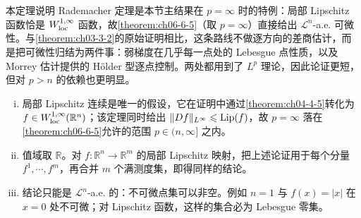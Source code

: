 \documentclass[../../main.tex]{subfiles}%
\begin{document}
\begin{remark}\label{remark:ch06-thm-6-6-动机}
本定理说明 Rademacher 定理是本节主结果在 $p=\infty$ 时的特例：局部 Lipschitz 函数恰是 $W^{1,\infty}_{\mathrm{loc}}$ 函数，故\cref{theorem:ch06-6-5}（取 $p=\infty$）直接给出 $\mathcal{L}^{n}$-a.e. 可微性。与\cref{theorem:ch03-3-2}的原始证明相比，这条路线不做逐方向的差商估计，而是把可微性归结为两件事：弱梯度在几乎每一点处的 Lebesgue 点性质，以及 Morrey 估计提供的 Hölder 型逐点控制。两处都用到了 $L^{p}$ 理论，因此论证更短，但对 $p>n$ 的依赖也更明显。%
\end{remark}

\begin{remark}\label{remark:ch06-thm-6-6-条件}
\begin{enumerate}[(i)]
\item 局部 Lipschitz 连续是唯一的假设，它在证明中通过\cref{theorem:ch04-4-5}转化为 $f\in W^{1,\infty}_{\mathrm{loc}}(\mathbb{R}^n)$；该定理同时给出 $\lVert Df\rVert_{L^{\infty}}\leqslant\operatorname{Lip}(f)$，故 $p=\infty$ 落在\cref{theorem:ch06-6-5}允许的范围 $p\in(n,\infty]$ 之内。%
\item 值域取 $\mathbb{R}$。对 $f:\mathbb{R}^n\to\mathbb{R}^m$ 的局部 Lipschitz 映射，把上述论证用于每个分量 $f^{1},\cdots,f^{m}$，再合并 $m$ 个满测度集，即得同样的结论。
\item 结论只能是 $\mathcal{L}^{n}$-a.e. 的：不可微点集可以非空。例如 $n=1$ 与 $f(x)=\lvert x\rvert$ 在 $x=0$ 处不可微；对 Lipschitz 函数，这样的集合必为 Lebesgue 零集。
\end{enumerate}
\end{remark}
\end{document}
